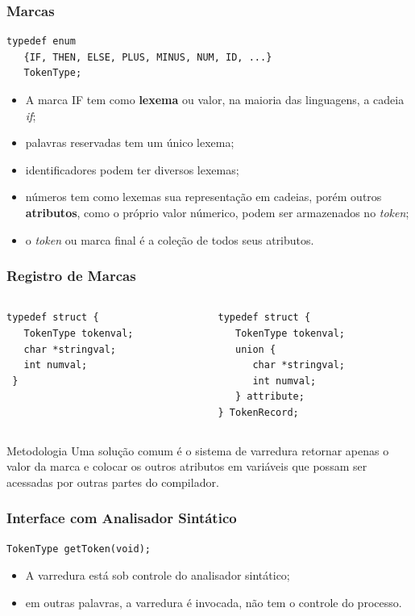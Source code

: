 \documentclass[table]{beamer}
\begin{document}
\begin{frame}[fragile]
   \frametitle{Marcas}
   \begin{verbatim}
typedef enum 
   {IF, THEN, ELSE, PLUS, MINUS, NUM, ID, ...}
   TokenType;
   \end{verbatim}
   \begin{itemize}
      \item A marca IF tem como \textbf{lexema} ou valor, na maioria das linguagens, a cadeia \textit{if};
      \item palavras reservadas tem um único lexema;
      \item identificadores podem ter diversos lexemas;
      \item números tem como lexemas sua representação em cadeias, porém outros \textbf{atributos}, como o próprio valor númerico, podem ser armazenados no \textit{token};
      \item o \textit{token} ou marca final é a coleção de todos seus atributos.
   \end{itemize}
\end{frame}

\begin{frame}[fragile]
   \frametitle{Registro de Marcas}
   \begin{columns}
      \begin{column}{0.5\textwidth}
         \begin{verbatim}
typedef struct {
   TokenType tokenval;
   char *stringval;
   int numval;
 }
	 \end{verbatim}
      \end{column}
      \begin{column}{0.5\textwidth}
         \begin{verbatim}
typedef struct {
   TokenType tokenval;
   union {
      char *stringval;
      int numval;
   } attribute;
} TokenRecord;
	 \end{verbatim}
      \end{column}
   \end{columns}

   \begin{block}{Metodologia}
   Uma solução comum é o sistema de varredura retornar apenas o valor da marca e colocar os outros atributos em variáveis que possam ser acessadas por outras partes do compilador.
   \end{block}
\end{frame}

\begin{frame}[fragile]
   \frametitle{Interface com Analisador Sintático}
   \begin{verbatim}
TokenType getToken(void);
   \end{verbatim}
   \begin{itemize}
      \item A varredura está sob controle do analisador sintático;
      \item em outras palavras, a varredura é invocada, não tem o controle do processo.
   \end{itemize}
\end{frame}
\end{document}
